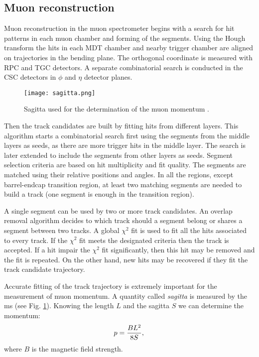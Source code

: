     \subsection{Muon reconstruction}
    Muon reconstruction in the muon spectrometer begins with a search for hit patterns in each muon chamber and forming of the segments. Using the Hough transform \cite{ILLINGWORTH198887} the hits in each MDT chamber and nearby trigger chamber are aligned on trajectories in the bending plane. The orthogonal coordinate is measured with RPC and TGC detectors. A separate combinatorial search is conducted in the CSC detectors in $\phi$ and $\eta$ detector planes.\\
     \begin{figure}[htbp]
    	\centering
    	\texttt{[image: sagitta.png]}
    	\caption[Muons sagitta]{Sagitta used for the determination of the muon momentum \cite{Kaiser:2010zea}.}
    	\label{fig::sagitta}
    \end{figure}
    Then the track candidates are built by fitting hits from different layers. This algorithm starts a combinatorial search first using the segments from the middle layers as seeds, as there are more trigger hits in the middle layer. The search is later extended to include the segments from other layers as seeds. Segment selection criteria are based on hit multiplicity and fit quality. The segments are matched using their relative positions and angles. In all the regions, except barrel-endcap transition region, at least two matching segments are needed to build a track (one segment is enough in the transition region).
    
    A single segment can be used by two or more track candidates. An overlap removal algorithm decides to which track should a segment belong or shares a segment between two tracks. A global $\chi^2$ fit is used to fit all the hits associated to every track. If the $\chi^2$ fit meets the designated criteria then the track is accepted. If a hit impair the $\chi^2$ fit significantly, then this hit may be removed and the fit is repeated. On the other hand, new hits may be recovered if they fit the track candidate trajectory. 
    
    Accurate fitting of the track trajectory is extremely important for the measurement of muon momentum. A quantity called \textit{sagitta} is measured by the \gls{ms} (see Fig. \ref{fig::sagitta}). Knowing the length $L$ and the sagitta $S$ we can determine the momentum:
    	\begin{equation}
    p = \frac{BL^2}{8S},\\
    \end{equation}
    where $B$ is the magnetic field strength.
    
